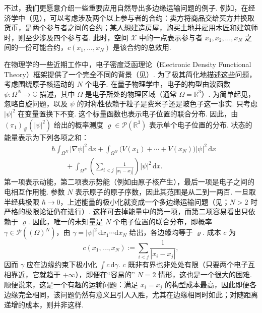 不过，我们更愿意介绍一些重要应用自然导出多边缘运输问题的例子. 例如，在经济学中（见\cite{b108}），可以考虑涉及两个以上参与者的合约：卖方将商品交给买方并换取货币，是两个参与者之间的合约；某人想建造房屋，购买土地并雇用木匠和建筑师时，则至少涉及四个参与者. 此时，空间 $\mathscr X$ 中的一点表示参与者 $x_1,x_2,\ldots,x_N$ 之间的一份可能合约，$c(x_1,\ldots,x_N)$ 是该合约的总效用.

\label{idx:i116-p49}
\label{idx:i38-p49}
在物理学的一些近期工作中，电子密度泛函理论（Electronic Density Functional Theory）框架提供了一个完全不同的背景（见\cite{b97,b128}）. 为了极其简化地描述这些问题，考虑围绕原子核运动的 $N$ 个电子. 在量子物理学中，电子的构型由波函数 $\psi:\Omega^N\to\mathbb C$ 描述，其中 $\Omega$ 是电子所处的物理区域（通常 $\Omega=\mathbb R^3$）. 为简单起见，忽略自旋问题，以及 $\psi$ 的对称性依赖于粒子是费米子还是玻色子这一事实. 只考虑 $|\psi|^2$ 在变量置换下不变. 这个标量函数也表示电子位置的联合分布. 因此，由 $(\pi_1)_\#(|\psi|^2)$ 给出的概率测度 $\varrho\in\mathscr P(\mathbb R^3)$ 表示单个电子位置的分布. 状态的能量表示为下列各项之和：
\begin{equation*}
\begin{aligned}
 &\hbar\int_{\Omega^N}|\nabla\psi|^2\,\mathrm dx
 +\int_{\Omega^N}\bigl(V(x_1)+\cdots+V(x_N)\bigr)|\psi|^2\,\mathrm dx\\
 &\qquad+\int_{\Omega^N}
       \left(\sum_{i<j}\frac1{|x_i-x_j|}\right)|\psi|^2\,\mathrm dx.
\end{aligned}
\end{equation*}
第一项表示动能，第二项表示势能（例如由原子核产生），最后一项是电子之间的电相互作用能. 参数 $N$ 表示原子的原子序数，因此其范围是从二到一两百. 一旦取半经典极限 $\hbar\to0$，上述能量的极小化就变成一个多边缘运输问题（见\cite{b128,b129}；$N>2$ 时严格的极限论证仍在进行）. 这样可去掉能量中的第一项，而第二项容易看出只依赖于 $\varrho$. 因此，唯一的未知量是 $N$ 个电子位置的联合分布，即概率 $\gamma\in\mathscr P((\Omega)^N)$，由 $\gamma=|\psi|^2\,\mathrm dx_1\cdots\mathrm dx_N$ 给出，各边缘均等于 $\varrho$. 成本 $c$ 为
\[
 c(x_1,\ldots,x_N):=\sum_{i<j}\frac1{|x_i-x_j|},
\]
因而 $\gamma$ 应在边缘约束下极小化 $\int c\,\mathrm d\gamma$. $c$ 既非有界也非处处有限（只要两个电子互相靠近，它就趋于 $+\infty$），即便在“容易的” $N=2$ 情形，这也是一个很大的困难. 顺便说来，这是一个有趣的运输问题：满足 $x_i=x_j$ 的构型成本最高，因此即便各边缘完全相同，该问题仍然有意义且引人入胜，尤其在边缘相同时如此；对随距离递增的成本，则并非这样.

